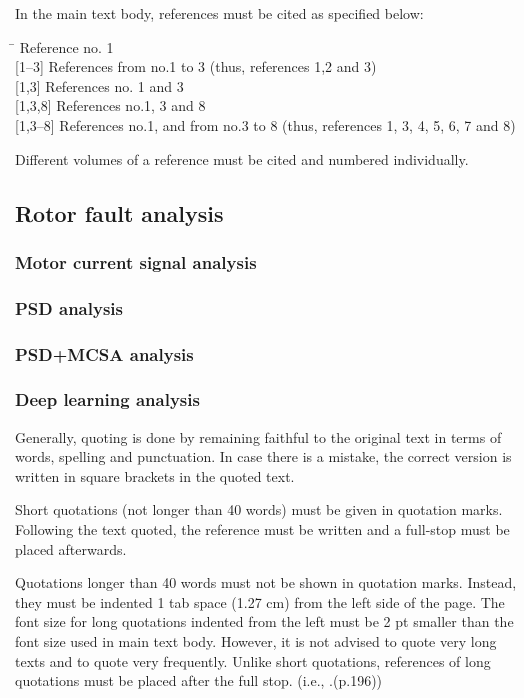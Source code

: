 In the main text body, references must be cited as specified below:
\vspace*{-12pt}
\begin{tabbing}
\hspace*{1.5cm}\= \kill
[1]      \> Reference no. 1\\

[1--3]   \> References from no.1 to 3 (thus, references 1,2 and 3)\\

[1,3]    \> References no. 1 and 3\\

[1,3,8]  \> References no.1, 3 and 8\\

[1,3--8] \> References no.1, and from no.3 to 8 (thus, references 1, 3, 4, 5, 6, 7 and 8)
\end{tabbing}
\vspace*{-12pt}
Different volumes of a reference must be cited and numbered individually.

\subsection{Rotor fault analysis}
\subsubsection{Motor current signal analysis}
\subsubsection{PSD analysis}
\subsubsection{PSD+MCSA analysis}
\subsubsection{Deep learning analysis}

Generally, quoting is done by remaining faithful to the original text in terms of words, spelling and punctuation. In case there is a mistake, the correct version is written in square brackets in the quoted text.

Short quotations (not longer than 40 words) must be given in quotation marks. Following the text quoted, the reference must be written and a full-stop must be placed afterwards.  

Quotations longer than 40 words must not be shown in quotation  marks. Instead, they must be indented 1 tab space (1.27 cm) from the left side of the page. The font size for long quotations indented from the left must be 2 pt smaller than the font size used in main text body. However, it is not advised to quote very long texts and to quote very frequently. Unlike short quotations, references of long quotations must be placed after the full stop. (i.e., .(p.196))

